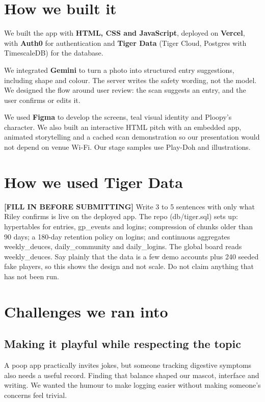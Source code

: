 \documentclass[11pt]{article}
\newcommand{\todo}[1]{\colorbox{yellow!40}{\parbox{0.92\linewidth}{\textbf{[FILL IN BEFORE SUBMITTING]} #1}}}
\begin{document}
\section*{How we built it}

We built the app with \textbf{HTML, CSS and JavaScript}, deployed on \textbf{Vercel}, with \textbf{Auth0} for authentication and \textbf{Tiger Data} (Tiger Cloud, Postgres with TimescaleDB) for the database.

We integrated \textbf{Gemini} to turn a photo into structured entry suggestions, including shape and colour. The server writes the safety wording, not the model. We designed the flow around user review: the scan suggests an entry, and the user confirms or edits it.

We used \textbf{Figma} to develop the screens, teal visual identity and Ploopy's character. We also built an interactive HTML pitch with an embedded app, animated storytelling and a cached scan demonstration so our presentation would not depend on venue Wi-Fi. Our stage samples use Play-Doh and illustrations.

\section*{How we used Tiger Data}

\todo{Write 3 to 5 sentences with only what Riley confirms is live on the deployed app. The repo (db/tiger.sql) sets up: hypertables for entries, gp\_events and logins; compression of chunks older than 90 days; a 180-day retention policy on logins; and continuous aggregates weekly\_deuces, daily\_community and daily\_logins. The global board reads weekly\_deuces. Say plainly that the data is a few demo accounts plus 240 seeded fake players, so this shows the design and not scale. Do not claim anything that has not been run.}

\section*{Challenges we ran into}

\subsection*{Making it playful while respecting the topic}

A poop app practically invites jokes, but someone tracking digestive symptoms also needs a useful record. Finding that balance shaped our mascot, interface and writing. We wanted the humour to make logging easier without making someone's concerns feel trivial.
\end{document}
